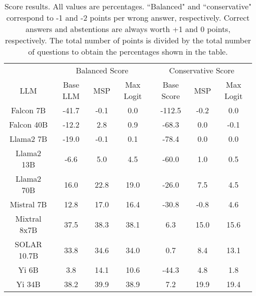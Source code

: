 \renewcommand\arraystretch{1.2}
\begin{table*}
\centering
\begin{tabular}{c|c|c|c|c|c|c}
& \multicolumn{3}{c|}{Balanced Score} & \multicolumn{3}{c}{Conservative Score} \\ 
LLM & Base LLM & MSP & Max Logit & Base Score & MSP & Max Logit\\ \hline
Falcon 7B & -41.7 & -0.1 & 0.0 & -112.5 & -0.2 & 0.0\\
Falcon 40B & -12.2 & 2.8 & 0.9 & -68.3 & 0.0 & -0.1\\
Llama2 7B & -19.0 & -0.1 & 0.1 & -78.4 & 0.0 & 0.0\\
Llama2 13B & -6.6 & 5.0 & 4.5 & -60.0 & 1.0 & 0.5\\
Llama2 70B & 16.0 & 22.8 & 19.0 & -26.0 & 7.5 & 4.5\\
Mistral 7B & 12.8 & 17.0 & 16.4 & -30.8 & -0.8 & 4.6\\
Mixtral 8x7B & 37.5 & 38.3 & 38.1 & 6.3 & 15.0 & 15.6\\
SOLAR 10.7B & 33.8 & 34.6 & 34.0 & 0.7 & 8.4 & 13.1\\
Yi 6B & 3.8 & 14.1 & 10.6 & -44.3 & 4.8 & 1.8\\
Yi 34B & 38.2 & 39.9 & 38.9 & 7.2 & 19.9 & 19.4\\
\hline
\end{tabular}
\caption{Score results. All values are percentages. ``Balanced" and ``conservative" correspond to -1 and -2 points per wrong answer, respectively. Correct answers and abstentions are always worth +1 and 0 points, respectively. The total number of points is divided by the total number of questions to obtain the percentages shown in the table.}
\label{tab:score}
\end{table*}
